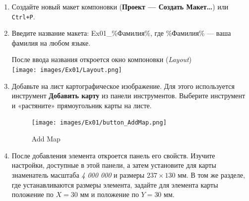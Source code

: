 \documentclass[
  12pt,
]{book}
\begin{document}
\begin{enumerate}
\def\labelenumi{\arabic{enumi}.}
\item
  Создайте новый макет компоновки (\textbf{Проект --- Создать Макет\ldots{}}) или \texttt{Ctrl+P}.
\item
  Введите название макета: Ex01\_\%Фамилия\%, где \%Фамилия\% --- ваша фамилия на любом языке.

  После ввода названия откроется окно компоновки (\emph{Layout})\\
  \texttt{[image: images/Ex01/Layout.png]}
\item
  Добавьте на лист картографическое изображение. Для этого используется инструмент \textbf{Добавить карту} из панели инструментов. Выберите инструмент и «растяните» прямоугольник карты на листе.

  \begin{figure}
  \centering
  \texttt{[image: images/Ex01/button\_AddMap.png]}
  \caption{Add Map}
  \end{figure}
\item
  После добавления элемента откроется панель его свойств. Изучите настройки, доступные в этой панели, а затем установите для карты знаменатель масштаба \emph{4 000 000} и размеры \(237\times130\) мм. В том же разделе, где устанавливаются размеры элемента, задайте для элемента карты положение по \(X = 30\) мм и положение по \(Y = 30\) мм.


\end{enumerate}
\end{document}
